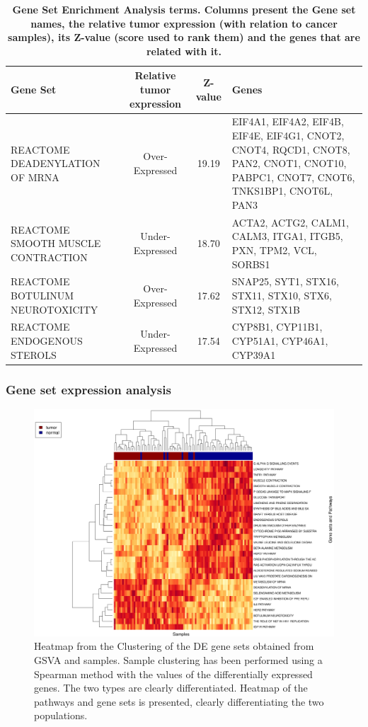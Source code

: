 \documentclass[9pt,twocolumn,twoside]{gsajnl}
\begin{document}
\begin{table}[!h]
\centering
\caption{\bf Gene Set Enrichment Analysis terms. Columns present the Gene set names, the relative tumor expression (with relation to cancer samples), its Z-value (score used to rank them) and the genes that are related with it.}
\begin{tableminipage}{\textwidth}
\small
\begin{tabular}{|l|c|c|p{6.3cm}|}
 \hline
Gene Set & Relative tumor expression &  Z-value & Genes \\
  \hline
REACTOME DEADENYLATION OF MRNA & Over-Expressed  & 19.19 & EIF4A1, EIF4A2, EIF4B, EIF4E, EIF4G1, CNOT2, CNOT4, RQCD1, CNOT8, PAN2, CNOT1, CNOT10, PABPC1, CNOT7, CNOT6, TNKS1BP1, CNOT6L, PAN3 \\
REACTOME SMOOTH MUSCLE CONTRACTION & Under-Expressed & 18.70 & ACTA2, ACTG2, CALM1, CALM3, ITGA1, ITGB5, PXN, TPM2, VCL, SORBS1 \\
REACTOME BOTULINUM NEUROTOXICITY & Over-Expressed &  17.62 & SNAP25, SYT1, STX16, STX11, STX10, STX6, STX12, STX1B \\
REACTOME ENDOGENOUS STEROLS & Under-Expressed & 17.54 & CYP8B1, CYP11B1, CYP51A1, CYP46A1, CYP39A1 \\
\hline
\end{tabular}
\label{tab:GSEAenrichment}
\end{tableminipage}
\end{table}


\subsubsection*{Gene set expression analysis}



\begin{figure}[!h]
\centering
\includegraphics[width=1\textwidth]{ClusteringGSVA.eps}
\caption{Heatmap from the Clustering of the DE gene sets obtained from GSVA and samples.  Sample clustering has been performed using a Spearman method with the values of the differentially expressed genes. The two types are clearly differentiated. Heatmap of the pathways and gene sets is presented, clearly differentiating the two populations. }
\label{fig:ClusteringGSVA}
\end{figure}
\end{document}
